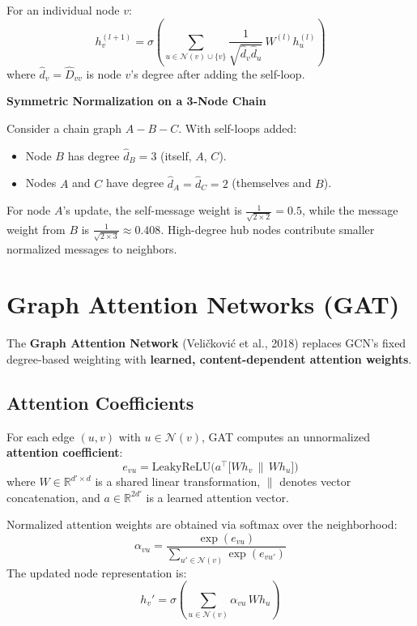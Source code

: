 \documentclass[12pt,a4paper]{article}
\begin{document}
For an individual node $v$:
\[
h_v^{(l+1)} = \sigma\left(\sum_{u \in \mathcal{N}(v) \cup \{v\}} \frac{1}{\sqrt{\hat{d}_v \hat{d}_u}}\, W^{(l)} h_u^{(l)}\right)
\]
where $\hat{d}_v = \hat{D}_{vv}$ is node $v$'s degree after adding the self-loop.

\begin{example}
\textbf{Symmetric Normalization on a 3-Node Chain}

Consider a chain graph $A - B - C$. With self-loops added:
\begin{itemize}
    \item Node $B$ has degree $\hat{d}_B = 3$ (itself, $A$, $C$).
    \item Nodes $A$ and $C$ have degree $\hat{d}_A = \hat{d}_C = 2$ (themselves and $B$).
\end{itemize}
For node $A$'s update, the self-message weight is $\frac{1}{\sqrt{2 \times 2}} = 0.5$, while the message weight from $B$ is $\frac{1}{\sqrt{2 \times 3}} \approx 0.408$. High-degree hub nodes contribute smaller normalized messages to neighbors.
\end{example}

\vspace{0.5cm}

\section{Graph Attention Networks (GAT)}

The \textbf{Graph Attention Network} (Veličković et al., 2018) replaces GCN's fixed degree-based weighting with \textbf{learned, content-dependent attention weights}.

\subsection{Attention Coefficients}

\begin{definition}
For each edge $(u,v)$ with $u \in \mathcal{N}(v)$, GAT computes an unnormalized \textbf{attention coefficient}:
\[
e_{vu} = \text{LeakyReLU}\Big(a^\top \big[W h_v \,\|\, W h_u\big]\Big)
\]
where $W \in \mathbb{R}^{d' \times d}$ is a shared linear transformation, $\|$ denotes vector concatenation, and $a \in \mathbb{R}^{2d'}$ is a learned attention vector.

Normalized attention weights are obtained via softmax over the neighborhood:
\[
\alpha_{vu} = \frac{\exp(e_{vu})}{\sum_{u' \in \mathcal{N}(v)} \exp(e_{vu'})}
\]
The updated node representation is:
\[
h_v' = \sigma\left(\sum_{u \in \mathcal{N}(v)} \alpha_{vu}\, W h_u\right)
\]
\end{definition}
\end{document}
